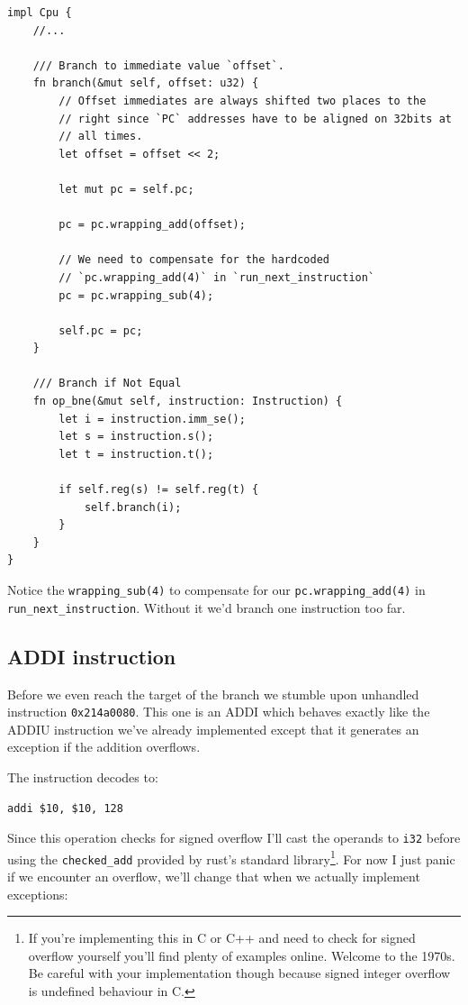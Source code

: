 \documentclass[a4paper]{article}
\newcommand{\code}[1] {\texttt{#1}}
\begin{document}
\begin{lstlisting}
impl Cpu {
    //...

    /// Branch to immediate value `offset`.
    fn branch(&mut self, offset: u32) {
        // Offset immediates are always shifted two places to the
        // right since `PC` addresses have to be aligned on 32bits at
        // all times.
        let offset = offset << 2;

        let mut pc = self.pc;

        pc = pc.wrapping_add(offset);

        // We need to compensate for the hardcoded
        // `pc.wrapping_add(4)` in `run_next_instruction`
        pc = pc.wrapping_sub(4);

        self.pc = pc;
    }

    /// Branch if Not Equal
    fn op_bne(&mut self, instruction: Instruction) {
        let i = instruction.imm_se();
        let s = instruction.s();
        let t = instruction.t();

        if self.reg(s) != self.reg(t) {
            self.branch(i);
        }
    }
}
\end{lstlisting}

Notice the \code{wrapping\_sub(4)} to compensate for our
\code{pc.wrapping\_add(4)} in
\code{run\_next\_instruction}. Without it we'd branch one
instruction too far.

\subsection{ADDI instruction}

Before we even reach the target of the branch we stumble upon
unhandled instruction \code{0x214a0080}. This one is an ADDI which
behaves exactly like the ADDIU instruction we've already implemented
except that it generates an exception if the addition overflows.

The instruction decodes to:
\begin{lstlisting}[language=assembly]
addi $10, $10, 128
\end{lstlisting}

Since this operation checks for signed overflow I'll cast the operands
to \code{i32} before using the \code{checked\_add} provided by
rust's standard library\footnote{If you're implementing this in C or
  C++ and need to check for signed overflow yourself you'll find
  plenty of examples online. Welcome to the 1970s. Be careful with
  your implementation though because signed integer overflow is
  undefined behaviour in C.}. For now I just panic if we encounter an
  overflow, we'll change that when we actually implement exceptions:
\end{document}
